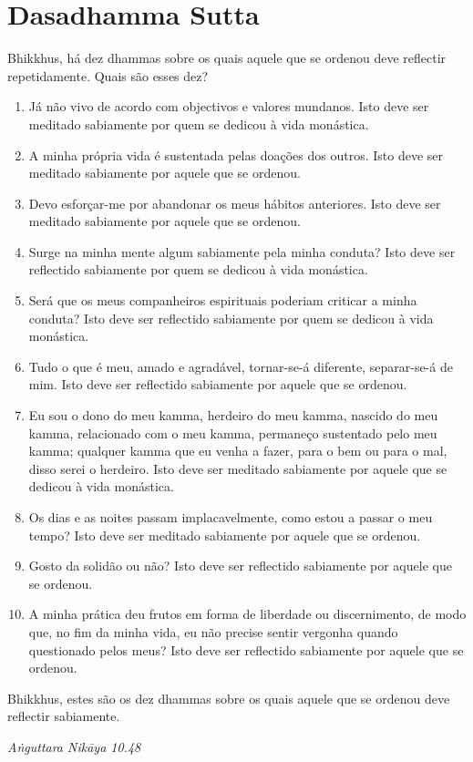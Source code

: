 \chapter{Dasadhamma Sutta}

Bhikkhus, há dez dhammas sobre os quais aquele que se ordenou deve reflectir repetidamente. Quais são esses dez?

\begin{enumerate}

\item Já não vivo de acordo com objectivos e valores mundanos. Isto deve ser meditado sabiamente por quem se dedicou à vida monástica.

\item A minha própria vida é sustentada pelas doações dos outros. Isto deve ser meditado sabiamente por aquele que se ordenou.

\item Devo esforçar-me por abandonar os meus hábitos anteriores. Isto deve ser meditado sabiamente por aquele que se ordenou.

\item Surge na minha mente algum sabiamente pela minha conduta? Isto deve ser reflectido sabiamente por quem se dedicou à vida monástica.

\item Será que os meus companheiros espirituais poderiam criticar a minha conduta? Isto deve ser reflectido sabiamente por quem se dedicou à vida monástica.

\item Tudo o que é meu, amado e agradável, tornar-se-á diferente, separar-se-á de mim. Isto deve ser reflectido sabiamente por aquele que se ordenou.

\item Eu sou o dono do meu kamma, herdeiro do meu kamma, nascido do meu kamma, relacionado com o meu kamma, permaneço sustentado pelo meu kamma; qualquer kamma que eu venha a fazer, para o bem ou para o mal, disso serei o herdeiro. Isto deve ser meditado sabiamente por aquele que se dedicou à vida monástica.

\item Os dias e as noites passam implacavelmente, como estou a passar o meu tempo? Isto deve ser meditado sabiamente por aquele que se ordenou.

\item Gosto da solidão ou não? Isto deve ser reflectido sabiamente por aquele que se ordenou.

\item A minha prática deu frutos em forma de liberdade ou discernimento, de modo que, no fim da minha vida, eu não precise sentir vergonha quando questionado pelos meus? Isto deve ser reflectido sabiamente por aquele que se ordenou.

\end{enumerate}

Bhikkhus, estes são os dez dhammas sobre os quais aquele que se ordenou deve reflectir sabiamente.

\emph{Aṅguttara Nikāya 10.48}
